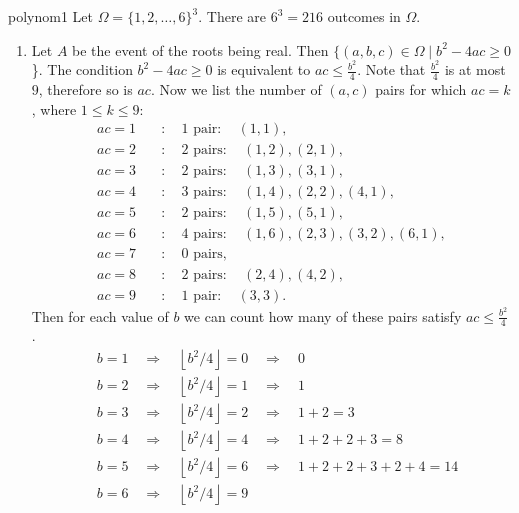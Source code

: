 \begin{sol}{polynom1}
    Let $\Omega=\{1,2,\ldots,6\} ^3$. There are $6^3=216$ outcomes in $\Omega$.
    \begin{enumerate}
        \item[(a)] Let $A$ be the event of the roots being real. Then $\{(a,b,c)\in\Omega\mid b^2-4ac\ge0$\}. The condition $b^2-4ac\ge0$ is equivalent to $ac\le\frac{b^2}{4}$. Note that $\frac{b^2}{4}$ is at most $9$, therefore so is $ac$. Now we list the number of $(a,c)$ pairs for which $ac=k$, where $1\le k\le9$:
        \begin{align*}
            ac=1\quad&:\quad\text{1 pair}:\quad(1,1),\\
            ac=2\quad&:\quad\text{2 pairs}:\quad(1,2),(2,1),\\
            ac=3\quad&:\quad\text{2 pairs}:\quad(1,3),(3,1),\\
            ac=4\quad&:\quad\text{3 pairs}:\quad(1,4),(2,2),(4,1),\\
            ac=5\quad&:\quad\text{2 pairs}:\quad(1,5),(5,1),\\
            ac=6\quad&:\quad\text{4 pairs}:\quad(1,6),(2,3),(3,2),(6,1),\\
            ac=7\quad&:\quad\text{0 pairs},\\
            ac=8\quad&:\quad\text{2 pairs}:\quad(2,4),(4,2),\\
            ac=9\quad&:\quad\text{1 pair}:\quad(3,3).
        \end{align*}
        Then for each value of $b$ we can count how many of these pairs satisfy $ac\le\frac{b^2}{4}$.
        \begin{align*}
            &b=1\quad\Longrightarrow\quad\left\lfloor b^2/4\right\rfloor=0
            \quad\Longrightarrow\quad 0\\
            &b=2\quad\Longrightarrow\quad\left\lfloor b^2/4\right\rfloor=1
            \quad\Longrightarrow\quad 1\\
            &b=3\quad\Longrightarrow\quad\left\lfloor b^2/4\right\rfloor=2
            \quad\Longrightarrow\quad 1+2=3\\
            &b=4\quad\Longrightarrow\quad\left\lfloor b^2/4\right\rfloor=4
            \quad\Longrightarrow\quad 1+2+2+3=8\\
            &b=5\quad\Longrightarrow\quad\left\lfloor b^2/4\right\rfloor=6
            \quad\Longrightarrow\quad 1+2+2+3+2+4=14\\
            &b=6\quad\Longrightarrow\quad\left\lfloor b^2/4\right\rfloor=9

\end{align*}
\end{enumerate}
\end{sol}
